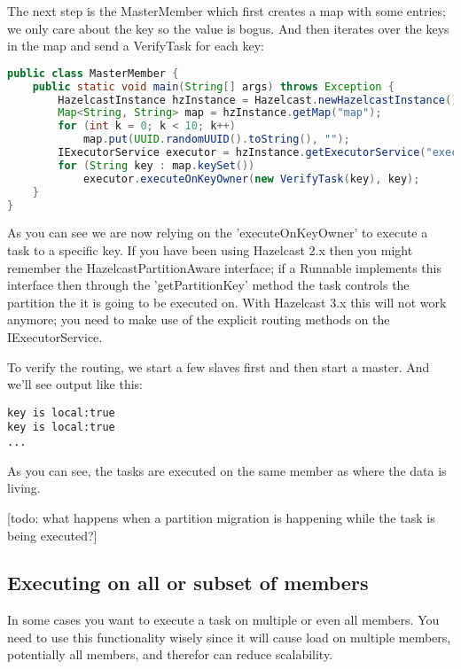 The next step is the MasterMember which first creates a map with some entries; we only care about the key so the value is bogus. And then iterates over the keys in the map and send a VerifyTask for each key:
\begin{lstlisting}[language=java]
public class MasterMember {
    public static void main(String[] args) throws Exception {
        HazelcastInstance hzInstance = Hazelcast.newHazelcastInstance();
        Map<String, String> map = hzInstance.getMap("map");
        for (int k = 0; k < 10; k++)
            map.put(UUID.randomUUID().toString(), "");
        IExecutorService executor = hzInstance.getExecutorService("executor");
        for (String key : map.keySet())
            executor.executeOnKeyOwner(new VerifyTask(key), key);
    }
}
\end{lstlisting}
As you can see we are now relying on the 'executeOnKeyOwner' to execute a task to a specific key. If you have been using Hazelcast 2.x then you might remember the HazelcastPartitionAware interface; if a Runnable implements this interface then through the 'getPartitionKey' method the task controls the partition the it is going to be executed on. With Hazelcast 3.x this will not work anymore; you need to make use of the explicit routing methods on the IExecutorService.

To verify the routing, we start a few slaves first and then start a master. And we'll see output like this:
\begin{lstlisting}
key is local:true
key is local:true
...
\end{lstlisting}
As you can see, the tasks are executed on the same member as where the data is living.

[todo: what happens when a partition migration is happening while the task is being executed?]

\subsection{Executing on all or subset of members}
In some cases you want to execute a task on multiple or even all members. You need to use this functionality wisely since it will cause load on multiple members, potentially all members, and therefor can reduce scalability.

